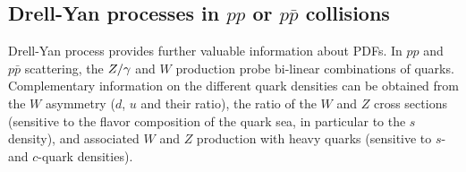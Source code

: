 \subsection{Drell-Yan processes  in $pp$ or $p\bar p$ collisions}
\label{dysection}

Drell-Yan process
provides further valuable information about PDFs.
In $pp$ and $p\bar p$ scattering, the $Z/\gamma\*$ and $W$ production 
probe bi-linear combinations of quarks. 
Complementary information on the different quark densities
can be obtained from the $W$ asymmetry ($d$, $u$ and their ratio),
the ratio of the $W$ and $Z$ cross sections (sensitive to the flavor 
composition of the quark sea, in particular to the $s$ density), 
and associated $W$ and $Z$ production with
heavy quarks (sensitive to $s$- and $c$-quark densities).
%


